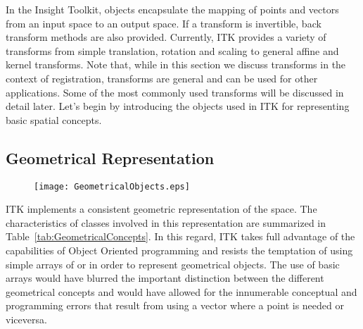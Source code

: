 
\def\tableconfiguration{ | p{3cm} | p{1.8cm} | p{2.5cm} | p{4cm} | }




In the Insight Toolkit,  objects encapsulate the mapping of
points and vectors from an input space to an output space.  If a transform is
invertible, back transform methods are also provided.  Currently, ITK provides
a variety of transforms from simple translation, rotation and scaling to
general affine and kernel transforms.  Note that, while in this section we
discuss transforms in the context of registration, transforms are general and
can be used for other applications. Some of the most commonly used transforms
will be discussed in detail later. Let's begin by introducing the objects used
in ITK for representing basic spatial concepts.


\subsection{Geometrical Representation}
\label{sec:GeometricalObjects}

\begin{figure}
\center
\texttt{[image: GeometricalObjects.eps]}
\label{fig:GeometricalObjects}
\end{figure}
 
ITK implements a consistent geometric representation of the space. The
characteristics of classes involved in this representation are summarized in
Table~\ref{tab:GeometricalConcepts}. In this regard, ITK takes full advantage
of the capabilities of Object Oriented programming and resists the temptation
of using simple arrays of  or  in order to represent
geometrical objects. The use of basic arrays would have blurred the important
distinction between the different geometrical concepts and would have allowed
for the innumerable conceptual and programming errors that result from using a
vector where a point is needed or viceversa.


